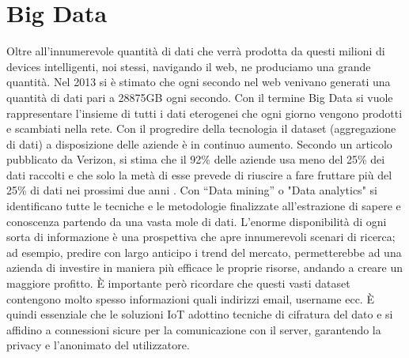 \section{Big Data}
Oltre all'innumerevole quantità di dati che verrà prodotta da questi milioni di
devices intelligenti, noi stessi,  navigando il web, ne produciamo una grande
quantità. Nel 2013 si è stimato che ogni secondo nel web venivano generati una
quantità di dati pari a 28875GB ogni secondo. Con il  termine Big Data si vuole
rappresentare l'insieme di tutti i dati eterogenei che ogni giorno vengono
prodotti e scambiati nella rete.
Con il progredire della tecnologia il dataset (aggregazione di dati) a
disposizione delle aziende è in continuo aumento.
Secondo un articolo pubblicato da Verizon, si stima che il 92\% delle aziende
usa meno del 25\% dei dati raccolti e che solo la metà  di esse prevede di
riuscire a fare fruttare più del 25\% di dati nei prossimi due anni
\cite{Verizon}.  Con “Data mining” o "Data analytics"  si identificano tutte le
tecniche e le metodologie finalizzate all’estrazione di sapere e conoscenza
partendo da una vasta mole di dati.
L’enorme disponibilità di ogni sorta di informazione è una prospettiva che 
apre innumerevoli scenari di ricerca; ad esempio, predire con largo anticipo i 
trend del mercato, permetterebbe ad una azienda di investire in maniera più
efficace le proprie risorse, andando a creare un maggiore profitto.
È importante però ricordare che questi vasti dataset contengono molto spesso
informazioni quali indirizzi email, username ecc. È  quindi essenziale che le
soluzioni IoT adottino tecniche di cifratura del dato e si affidino a
connessioni sicure per la comunicazione con il server, garantendo la privacy e
l'anonimato del utilizzatore.

